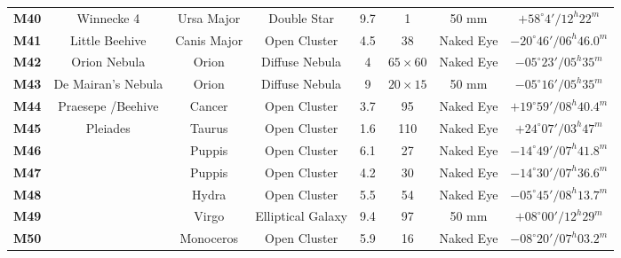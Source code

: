\documentclass[a4paper,12pt]{extarticle}
\begin{document}
\begin{table}[H]
\begin{tabular}{cccccccc}
\textbf{M40} & \multicolumn{1}{c}{Winnecke 4}                                     & Ursa Major  & Double Star       & 9.7 & 1     & 50 mm     & $+58^\circ 4'/ 12^h 22^m$            \\
\rowcolor[HTML]{D9EAD3} 
\textbf{M41} & \multicolumn{1}{c}{\cellcolor[HTML]{D9EAD3}Little Beehive}         & Canis Major & Open Cluster      & 4.5 & 38    & Naked Eye & $-20^\circ 46'/ 06^h 46.0^m$         \\
\rowcolor[HTML]{E6B8AF} 
\textbf{M42} & \multicolumn{1}{c}{\cellcolor[HTML]{E6B8AF}Orion Nebula}           & Orion       & Diffuse Nebula    & 4   & $65\times 60$  & Naked Eye & $-05^\circ 23'/ 05^h 35^m$           \\
\rowcolor[HTML]{E6B8AF} 
\textbf{M43} & \multicolumn{1}{c}{\cellcolor[HTML]{E6B8AF}De  Mairan’s Nebula}    & Orion       & Diffuse Nebula    & 9   & $20\times 15$  & 50 mm     & $-05^\circ 16'/ 05^h 35^m$           \\
\rowcolor[HTML]{D9EAD3} 
\textbf{M44} & \multicolumn{1}{c}{\cellcolor[HTML]{D9EAD3}Praesepe /Beehive}      & Cancer      & Open Cluster      & 3.7 & 95    & Naked Eye & $+19^\circ 59'/ 08^h 40.4^m$         \\
\rowcolor[HTML]{D9EAD3} 
\textbf{M45} & \multicolumn{1}{c}{\cellcolor[HTML]{D9EAD3}Pleiades}               & Taurus      & Open Cluster      & 1.6 & 110   & Naked Eye & $+24^\circ 07'/ 03^h 47^m$     \\
\rowcolor[HTML]{D9EAD3} 
\textbf{M46} &                                                              & Puppis         & Open Cluster      & 6.1 & 27  & Naked Eye & $-14^\circ 49'/ 07^h 41.8^m$    \\
\rowcolor[HTML]{D9EAD3} 
\textbf{M47} &                                                              & Puppis         & Open Cluster      & 4.2 & 30  & Naked Eye & $-14^\circ 30'/ 07^h 36.6^m$    \\
\rowcolor[HTML]{D9EAD3} 
\textbf{M48} &                                                              & Hydra          & Open Cluster      & 5.5 & 54  & Naked Eye & $-05^\circ 45'/ 08^h 13.7^m$    \\
\rowcolor[HTML]{F3F3F3} 
\textbf{M49} &                                                              & Virgo          & Elliptical Galaxy & 9.4 & 97  & 50 mm     & $+08^\circ 00'/ 12^h 29^m$      \\
\rowcolor[HTML]{D9EAD3} 
\textbf{M50} &                                                              & Monoceros      & Open Cluster      & 5.9 & 16  & Naked Eye & $-08^\circ 20'/ 07^h 03.2^m$    \\

\end{tabular}
\end{table}
\end{document}
